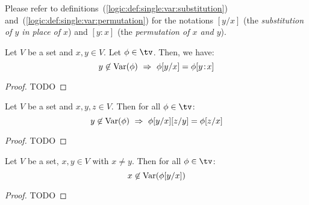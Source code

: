 Please refer to definitions~(\ref{logic:def:single:var:substitution})
and~(\ref{logic:def:single:var:permutation}) for the notations $[y/x]$ 
(the {\em substitution of $y$ in place of $x$}) and 
$[y\!:\!x]$ (the  {\em permutation of $x$ and $y$}).

\begin{prop}\label{logic:prop:LAM:permutation:is:substitution}
Let $V$ be a set and $x,y\in V$. Let $\phi\in\tv$. Then, we have:
    \[
    y\not\in\var(\phi)\ \Rightarrow\ \phi[y/x]=\phi[y\!:\!x]
    \]
\end{prop}
\begin{proof}
TODO
\end{proof}

\begin{prop}\label{logic:prop:LAM:single:composition}
Let $V$ be a set and $x,y,z\in V$. Then for all $\phi\in\tv$:
    \[
    y\not\in\var(\phi)\ \Rightarrow\ \phi[y/x][z/y]=\phi[z/x]
    \]
\end{prop}
\begin{proof}
TODO
\end{proof}

\begin{prop}\label{logic:prop:LAM:inplaceof:notvar}
Let $V$ be a set, $x,y\in V$ with $x\neq y$. Then for all $\phi\in\tv$:
    \[
    x\not\in\mbox{\rm Var}(\phi[y/x])
    \]
\end{prop}
\begin{proof}
TODO
\end{proof}

